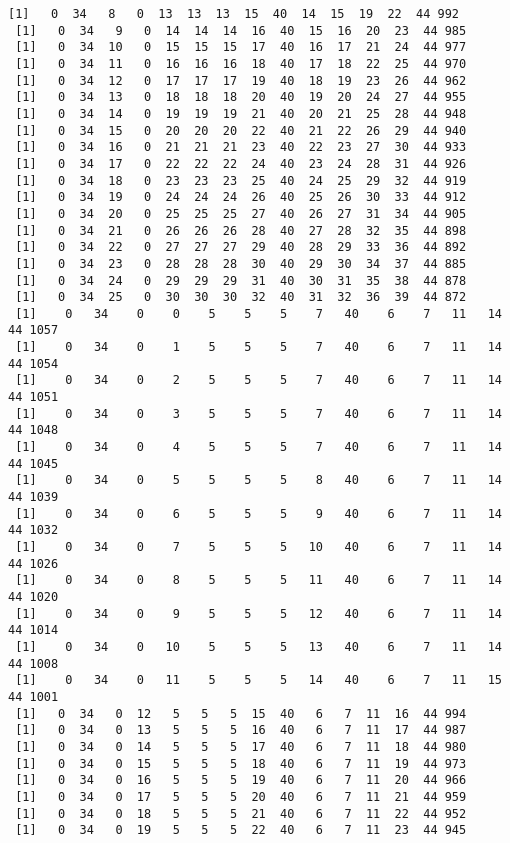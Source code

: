 \documentclass[11pt]{article}
\begin{document}
\begin{Verbatim}[commandchars=\\\{\}]
 [1]   0  34   8   0  13  13  13  15  40  14  15  19  22  44 992
 [1]   0  34   9   0  14  14  14  16  40  15  16  20  23  44 985
 [1]   0  34  10   0  15  15  15  17  40  16  17  21  24  44 977
 [1]   0  34  11   0  16  16  16  18  40  17  18  22  25  44 970
 [1]   0  34  12   0  17  17  17  19  40  18  19  23  26  44 962
 [1]   0  34  13   0  18  18  18  20  40  19  20  24  27  44 955
 [1]   0  34  14   0  19  19  19  21  40  20  21  25  28  44 948
 [1]   0  34  15   0  20  20  20  22  40  21  22  26  29  44 940
 [1]   0  34  16   0  21  21  21  23  40  22  23  27  30  44 933
 [1]   0  34  17   0  22  22  22  24  40  23  24  28  31  44 926
 [1]   0  34  18   0  23  23  23  25  40  24  25  29  32  44 919
 [1]   0  34  19   0  24  24  24  26  40  25  26  30  33  44 912
 [1]   0  34  20   0  25  25  25  27  40  26  27  31  34  44 905
 [1]   0  34  21   0  26  26  26  28  40  27  28  32  35  44 898
 [1]   0  34  22   0  27  27  27  29  40  28  29  33  36  44 892
 [1]   0  34  23   0  28  28  28  30  40  29  30  34  37  44 885
 [1]   0  34  24   0  29  29  29  31  40  30  31  35  38  44 878
 [1]   0  34  25   0  30  30  30  32  40  31  32  36  39  44 872
 [1]    0   34    0    0    5    5    5    7   40    6    7   11   14   44 1057
 [1]    0   34    0    1    5    5    5    7   40    6    7   11   14   44 1054
 [1]    0   34    0    2    5    5    5    7   40    6    7   11   14   44 1051
 [1]    0   34    0    3    5    5    5    7   40    6    7   11   14   44 1048
 [1]    0   34    0    4    5    5    5    7   40    6    7   11   14   44 1045
 [1]    0   34    0    5    5    5    5    8   40    6    7   11   14   44 1039
 [1]    0   34    0    6    5    5    5    9   40    6    7   11   14   44 1032
 [1]    0   34    0    7    5    5    5   10   40    6    7   11   14   44 1026
 [1]    0   34    0    8    5    5    5   11   40    6    7   11   14   44 1020
 [1]    0   34    0    9    5    5    5   12   40    6    7   11   14   44 1014
 [1]    0   34    0   10    5    5    5   13   40    6    7   11   14   44 1008
 [1]    0   34    0   11    5    5    5   14   40    6    7   11   15   44 1001
 [1]   0  34   0  12   5   5   5  15  40   6   7  11  16  44 994
 [1]   0  34   0  13   5   5   5  16  40   6   7  11  17  44 987
 [1]   0  34   0  14   5   5   5  17  40   6   7  11  18  44 980
 [1]   0  34   0  15   5   5   5  18  40   6   7  11  19  44 973
 [1]   0  34   0  16   5   5   5  19  40   6   7  11  20  44 966
 [1]   0  34   0  17   5   5   5  20  40   6   7  11  21  44 959
 [1]   0  34   0  18   5   5   5  21  40   6   7  11  22  44 952
 [1]   0  34   0  19   5   5   5  22  40   6   7  11  23  44 945

\end{Verbatim}
\end{document}
